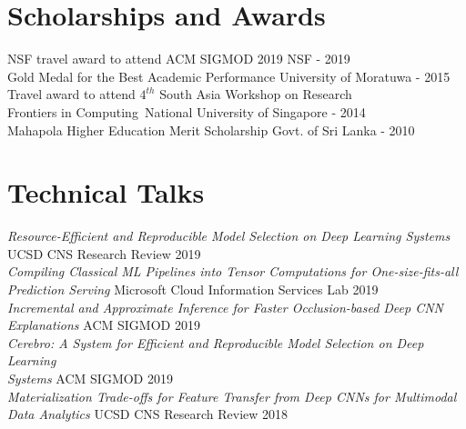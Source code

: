 \documentclass[margin]{res}
\begin{document}
\begin{resume}
\section{Scholarships and Awards}
NSF travel award to attend ACM SIGMOD 2019 \hfill NSF - 2019
\\
Gold Medal for the Best Academic Performance \hfill University of Moratuwa - 2015
\\
Travel award to attend $4^{th}$ South Asia Workshop on Research\\ Frontiers in Computing~\hfill National University of Singapore - 2014
\\
Mahapola Higher Education Merit Scholarship \hfill Govt. of Sri Lanka - 2010


\section{Technical Talks}
\textit{Resource-Efficient and Reproducible Model Selection on Deep Learning Systems} \hfill UCSD CNS Research Review 2019\\
\textit{Compiling Classical ML Pipelines into Tensor Computations for One-size-fits-all Prediction Serving} \hfill Microsoft Cloud Information Services Lab 2019\\
\textit{Incremental and Approximate Inference for Faster Occlusion-based Deep CNN Explanations} \hfill ACM SIGMOD 2019\\
\textit{Cerebro: A System for Efficient and Reproducible Model Selection on Deep Learning \\Systems} \hfill ACM SIGMOD 2019\\
\textit{Materialization Trade-offs for Feature Transfer from Deep CNNs for Multimodal Data Analytics} \hfill UCSD CNS Research Review 2018\\



\end{resume}
\end{document}
